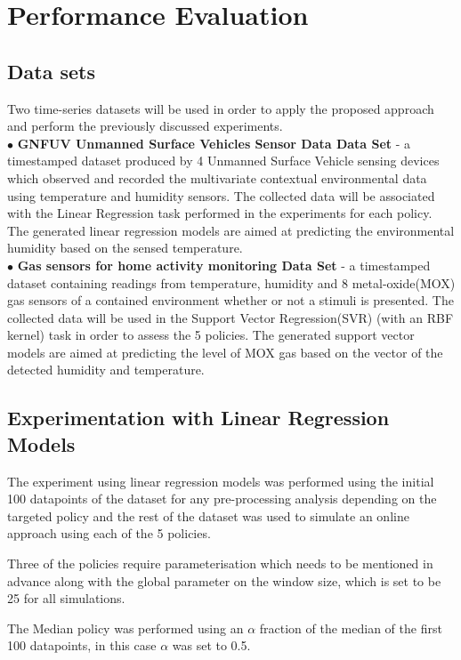 \documentclass{mpaper}
\begin{document}
\section{Performance Evaluation}
\subsection{Data sets}
Two time-series datasets will be used in order to apply the proposed approach and perform the previously discussed experiments.
\\$\bullet$ \textbf{GNFUV Unmanned Surface Vehicles Sensor Data Data Set} \cite{harth2018} - a timestamped dataset produced by 4 Unmanned Surface Vehicle sensing devices which observed and recorded the multivariate contextual environmental data using temperature and humidity sensors. The collected data will be associated with the Linear Regression task performed in the experiments for each policy. The generated linear regression models are aimed at predicting the environmental humidity based on the sensed temperature.
\\$\bullet$ \textbf{Gas sensors for home activity monitoring Data Set } \cite{HUERTA2016169} - a timestamped dataset containing readings from temperature, humidity and 8 metal-oxide(MOX) gas sensors of a contained environment whether or not a stimuli is presented. The collected data will be used in the Support Vector Regression(SVR) (with an RBF kernel) task in order to assess the 5 policies. The generated support vector models are aimed at predicting the level of MOX gas based on the vector of the detected humidity and temperature.

\subsection{Experimentation with Linear Regression Models}
The experiment using linear regression models was performed using the initial 100 datapoints of the dataset for any pre-processing analysis depending on the targeted policy and the rest of the dataset was used to simulate an online approach using each of the 5 policies.

Three of the policies require parameterisation which needs to be mentioned in advance along with the global parameter on the window size, which is set to be 25 for all simulations.

The Median policy was performed using an $\alpha$ fraction of the median of the first 100 datapoints, in this case $\alpha$ was set to 0.5.
\end{document}
